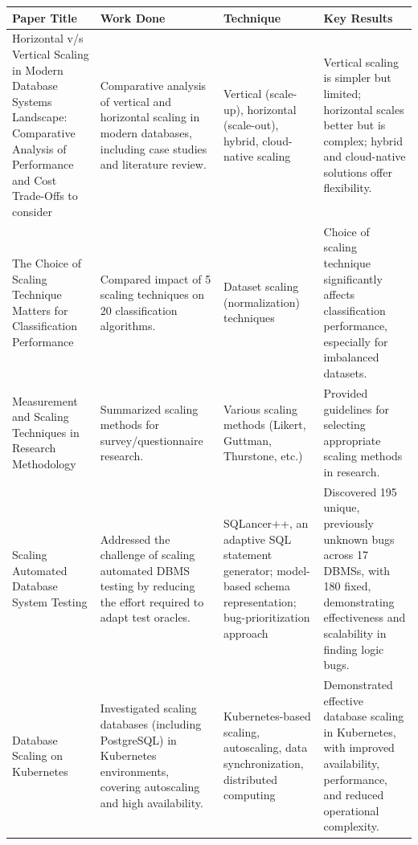 \documentclass[conference]{IEEEtran}
\begin{document}
\begin{table}[htbp]
\centering
\small
\begin{tabular}{|p{1.6cm}|p{1.8cm}|p{2.0cm}|p{1.8cm}|}
\hline
\textbf{Paper Title} & \textbf{Work Done} & \textbf{Technique} & \textbf{Key Results} \\
\hline
Horizontal v/s Vertical Scaling in Modern Database Systems Landscape: Comparative Analysis of Performance and Cost Trade-Offs to consider\cite{b8} & Comparative analysis of vertical and horizontal scaling in modern databases, including case studies and literature review. & Vertical (scale-up), horizontal (scale-out), hybrid, cloud-native scaling & Vertical scaling is simpler but limited; horizontal scales better but is complex; hybrid and cloud-native solutions offer flexibility.\\
\hline
The Choice of Scaling Technique Matters for Classification Performance\cite{b2} & Compared impact of 5 scaling techniques on 20 classification algorithms. & Dataset scaling (normalization) techniques & Choice of scaling technique significantly affects classification performance, especially for imbalanced datasets.\\
\hline
Measurement and Scaling Techniques in Research Methodology\cite{b10} & Summarized scaling methods for survey/questionnaire research. & Various scaling methods (Likert, Guttman, Thurstone, etc.) & Provided guidelines for selecting appropriate scaling methods in research.\\
\hline
Scaling Automated Database System Testing\cite{b2} & Addressed the challenge of scaling automated DBMS testing by reducing the effort required to adapt test oracles. & SQLancer++, an adaptive SQL statement generator; model-based schema representation; bug-prioritization approach & Discovered 195 unique, previously unknown bugs across 17 DBMSs, with 180 fixed, demonstrating effectiveness and scalability in finding logic bugs.\\
\hline
Database Scaling on Kubernetes\cite{b1} & Investigated scaling databases (including PostgreSQL) in Kubernetes environments, covering autoscaling and high availability. & Kubernetes-based scaling, autoscaling, data synchronization, distributed computing & Demonstrated effective database scaling in Kubernetes, with improved availability, performance, and reduced operational complexity.\\
\hline
\end{tabular}
\end{table}
\end{document}
